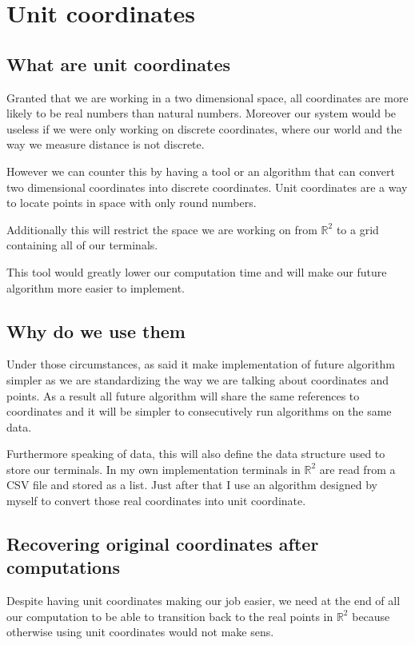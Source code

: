 \chapter{Unit coordinates}
\section{What are unit coordinates}%
	Granted that we are working in a two dimensional space, all coordinates are more likely to be real numbers than natural numbers.
	Moreover our system would be useless if we were only working on discrete coordinates, where our world and the way we measure distance is not discrete.
	
	However we can counter this by having a tool or an algorithm that can convert two dimensional coordinates into discrete coordinates. Unit coordinates are a way to locate points in space with only round numbers.
	
	Additionally this will restrict the space we are working on from $\mathbb{R}^2$ to a grid containing all of our terminals.
	
	This tool would greatly lower our computation time and will make our future algorithm more easier to implement.
\section{Why do we use them}%
	Under those circumstances, as said it make implementation of future algorithm simpler as we are standardizing the way we are talking about coordinates and points. As a result all future algorithm will share the same references to coordinates and it will be simpler to consecutively run algorithms on the same data.
	
	Furthermore speaking of data, this will also define the data structure used to store our terminals. In my own implementation terminals in $\mathbb{R}^2$ are read from a CSV file and stored as a list. Just after that I use an algorithm designed by myself to convert those real coordinates into unit coordinate.

\section{Recovering original coordinates after computations}%
Despite having unit coordinates making our job easier, we need at the end of all our computation to be able to transition back to the real points in $\mathbb{R}^2$ because otherwise using unit coordinates would not make sens.

